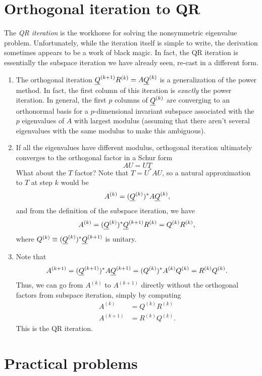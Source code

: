 \documentclass[12pt, leqno]{article}
\begin{document}

\section{Orthogonal iteration to QR}

The {\em QR iteration} is the workhorse for solving the nonsymmetric
eigenvalue problem.  Unfortunately, while the iteration itself is
simple to write, the derivation sometimes appears to be a work of
black magic.  In fact, the QR iteration is essentially the subspace
iteration we have already seen, re-cast in a different form.

\begin{enumerate}
\item
  The orthogonal iteration $\underline{Q}^{(k+1)} R^{(k)} = A \underline{Q}^{(k)}$ is a
  generalization of the power method.  In fact, the first column of
  this iteration is {\em exactly} the power iteration.  In general,
  the first $p$ columns of $\underline{Q}^{(k)}$ are converging to an orthonormal
  basis for a $p$-dimensional invariant subspace associated with the
  $p$ eigenvalues of $A$ with largest modulus (assuming that there
  aren't several eigenvalues with the same modulus to make this
  ambiguous).
\item
  If all the eigenvalues have different modulus, orthogonal iteration
  ultimately converges to the orthogonal factor in a Schur form
  \[
    AU = UT
  \]
  What about the $T$ factor?  Note that $T = U^* A U$, so a natural
  approximation to $T$ at step $k$ would be
  \[
    A^{(k)} = (\underline{Q}^{(k)})^* A \underline{Q}^{(k)},
  \]
  and from the definition of the subspace iteration, we have
  \[
    A^{(k)} = (\underline{Q}^{(k)})^* \underline{Q}^{(k+1)} R^{(k)} = Q^{(k)} R^{(k)},
  \]
  where $Q^{(k)} \equiv (\underline{Q}^{(k)})^* \underline{Q}^{(k+1)}$ is unitary.
\item
  Note that
  \[
    A^{(k+1)}
    = (\underline{Q}^{(k+1)})^* A \underline{Q}^{(k+1)}
    = (Q^{(k)})^* A^{(k)} Q^{(k)}
    = R^{(k)} Q^{(k)}.
  \]
  Thus, we can go from $A^{(k)}$ to $A^{(k+1)}$ directly without
  the orthogonal factors from subspace iteration, simply by computing
  \begin{align*}
    A^{(k)} &= Q^{(k)} R^{(k)} \\
    A^{(k+1)} &= R^{(k)} Q^{(k)}.
  \end{align*}
  This is the QR iteration.
\end{enumerate}

\section{Practical problems}
\end{document}
